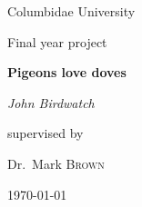 \documentclass[12pt,a4paper,titlepage,dvipsnames]{book}
\begin{document}
\begin{titlepage}
	\centering
	\vspace{1cm}
	{\LARGE Columbidae University \par}
	\vspace{1cm}
	{\Large Final year project\par}
	\vspace{1.5cm}
	{\huge\bfseries Pigeons love doves\par}
	\vspace{2cm}
	{\Large\itshape John Birdwatch\par}
	\vfill
	supervised by\par
	Dr.~Mark \textsc{Brown}

	\vfill

	{\large \today\par}
\end{titlepage}
\end{document}
